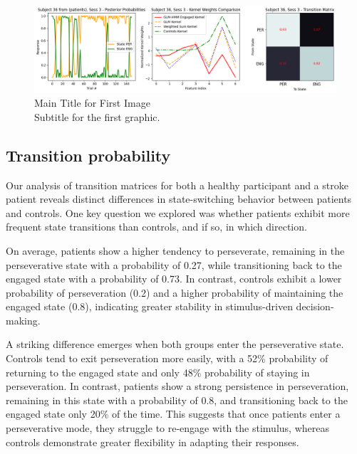 \begin{figure}[H]
    \centering
    \includegraphics[width=18cm]{MainLayout/Images/chapter7/subject_36_session_3.png}
    \caption{Main Title for First Image \\ \small Subtitle for the first graphic.}
    \label{fig:patient_after_glmhmm}
\end{figure}

\subsection{Transition probability}
Our analysis of transition matrices for both a healthy participant and a stroke patient reveals distinct differences in state-switching behavior between patients and controls. One key question we explored was whether patients exhibit more frequent state transitions than controls, and if so, in which direction.

On average, patients show a higher tendency to perseverate, remaining in the perseverative state with a probability of 0.27, while transitioning back to the engaged state with a probability of 0.73. In contrast, controls exhibit a lower probability of perseveration (0.2) and a higher probability of maintaining the engaged state (0.8), indicating greater stability in stimulus-driven decision-making.

A striking difference emerges when both groups enter the perseverative state. Controls tend to exit perseveration more easily, with a 52\% probability of returning to the engaged state and only 48\% probability of staying in perseveration. In contrast, patients show a strong persistence in perseveration, remaining in this state with a probability of 0.8, and transitioning back to the engaged state only 20\% of the time. This suggests that once patients enter a perseverative mode, they struggle to re-engage with the stimulus, whereas controls demonstrate greater flexibility in adapting their responses.

